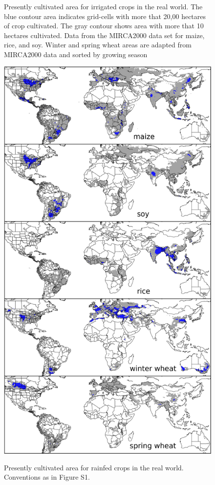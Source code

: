 \documentclass[12pt]{article}
\begin{document}
{{\begin{figure}[h!]
\begin{minipage}{.45\textwidth}
    \caption{
    Presently cultivated area for irrigated crops in the real world. 
    The blue contour area indicates grid-cells with more that 20,00 hectares of crop cultivated. 
    The gray contour shows area with more that 10 hectares cultivated. Data from the MIRCA2000 data set for maize, rice, and soy. 
    Winter and spring wheat areas are adapted from MIRCA2000 data and sorted by growing season
    }
    \label{fig:irrarea}
\end{minipage}
\hspace{.05\linewidth}
\begin{minipage}{.45\textwidth}
    \centering
    \vspace{-19mm}
    \includegraphics[width=\textwidth]{s_croparea.png}\\
    \caption{Presently cultivated area for rainfed crops in the real world. Conventions as in Figure S1.}
    \label{fig:rainfed}
\end{minipage}
\end{figure}

}}
\end{document}
